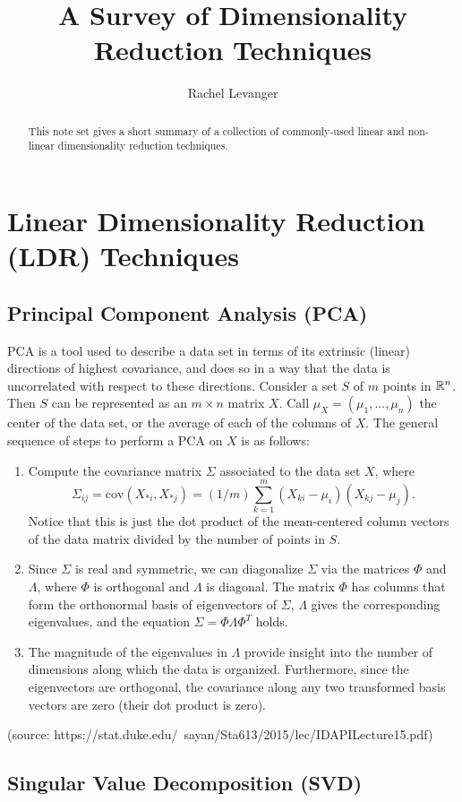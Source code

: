 \documentclass{gtpart}
\title{A Survey of Dimensionality Reduction Techniques}
\author{Rachel Levanger}
\theoremstyle{definition}
\begin{document}
\begin{abstract}    %

This note set gives a short summary of a collection of commonly-used linear and non-linear dimensionality reduction techniques.

\end{abstract}

\maketitle

\tableofcontents


\pagebreak 

\section{Linear Dimensionality Reduction (LDR) Techniques}

\subsection{Principal Component Analysis (PCA)} 

PCA is a tool used to describe a data set in terms of its extrinsic (linear) directions of highest covariance, and does so in a way that the data is uncorrelated with respect to these directions. Consider a set $S$ of $m$ points in $\mathbb{R}^n$. Then $S$ can be represented as an $m \times n$ matrix $X$. Call $\mu_X = (\mu_1, ..., \mu_n)$ the center of the data set, or the average of each of the columns of $X$. The general sequence of steps to perform a PCA on $X$ is as follows:
\begin{enumerate}[(1)]
\item Compute the covariance matrix $\Sigma$ associated to the data set $X$, where $$\Sigma_{ij} = \text{cov}(X_{*i}, X_{*j}) =(1/m) \sum_{k=1}^m (X_{ki} - \mu_i)(X_{kj} - \mu_j).$$ Notice that this is just the dot product of the mean-centered column vectors of the data matrix divided by the number of points in $S$.
\item Since $\Sigma$ is real and symmetric, we can diagonalize $\Sigma$ via the matrices $\Phi$ and $\Lambda$, where $\Phi$ is orthogonal and $\Lambda$ is diagonal. The matrix $\Phi$ has columns that form the orthonormal basis of eigenvectors of $\Sigma$, $\Lambda$ gives the corresponding eigenvalues, and the equation $\Sigma = \Phi \Lambda \Phi^T$ holds.
\item The magnitude of the eigenvalues in $\Lambda$ provide insight into the number of dimensions along which the data is organized. Furthermore, since the eigenvectors are orthogonal, the covariance along any two transformed basis vectors are zero (their dot product is zero).
\end{enumerate}

(source: https://stat.duke.edu/~sayan/Sta613/2015/lec/IDAPILecture15.pdf)

\subsection{Singular Value Decomposition (SVD)}
\end{document}

